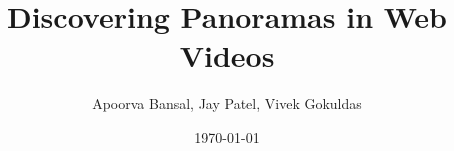 \documentclass[11pt]{article}
\author{Apoorva Bansal, Jay Patel, Vivek Gokuldas}
\title{Discovering Panoramas in Web Videos}
\date{\today}
\begin{document}
\maketitle



\begin{multicols}{2}








\end{multicols}
\end{document}
